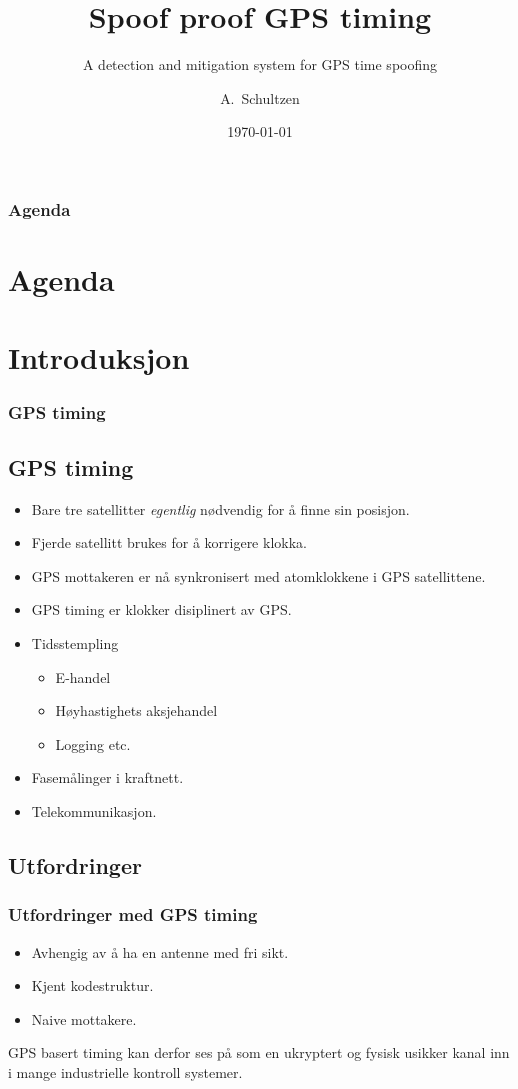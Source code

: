 \documentclass[xcolor=table]{beamer}
\title[Spoof proof GPS timing] %
{Spoof proof GPS timing}
\subtitle{A detection and mitigation system for GPS time spoofing}
\author[A. Schultzen] %
{A.~Schultzen\inst{1}}
\institute[Universities Here and There] %
{
  \inst{1}%
  Institutt for informatikk\\
  Universitetet i Oslo
}
\date{\today}
\begin{document}
\frame{\titlepage}
\begin{frame}
\frametitle{Agenda}
\section *{Agenda}
\tableofcontents
\end{frame}

\section{Introduksjon}
\begin{frame}
\frametitle{GPS timing}
	\subsection{GPS timing}
  \begin{itemize}
    \item Bare tre satellitter \textit{egentlig} nødvendig for å finne sin posisjon.
    \item Fjerde satellitt brukes for å korrigere klokka.    
    \item GPS mottakeren er nå synkronisert med atomklokkene i GPS satellittene.
    \item GPS timing er klokker disiplinert av GPS.
  \end{itemize}
  \begin{itemize}
    \item Tidsstempling 
    \begin{itemize}
      \item E-handel
      \item Høyhastighets aksjehandel
      \item Logging etc.
    \end{itemize}
    \item Fasemålinger i kraftnett.
    \item Telekommunikasjon.
  \end{itemize}
\end{frame}

\subsection{Utfordringer}
\begin{frame}
\frametitle{Utfordringer med GPS timing}
  \begin{itemize}
    \item Avhengig av å ha en antenne med fri sikt.
    \item Kjent kodestruktur.
    \item Naive mottakere.
  \end{itemize}
  GPS basert timing kan derfor ses på som en ukryptert og fysisk usikker kanal inn i mange industrielle kontroll systemer.
\end{frame}
\end{document}
